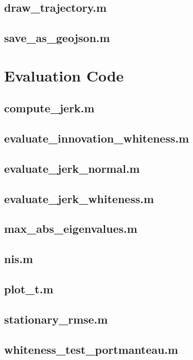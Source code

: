 \subsection{draw\_trajectory.m}

\subsection{save\_as\_geojson.m}


\section{Evaluation Code}
\subsection{compute\_jerk.m}

\subsection{evaluate\_innovation\_whiteness.m}

\subsection{evaluate\_jerk\_normal.m}

\subsection{evaluate\_jerk\_whiteness.m}

\subsection{max\_abs\_eigenvalues.m}

\subsection{nis.m}

\subsection{plot\_t.m}

\subsection{stationary\_rmse.m}

\subsection{whiteness\_test\_portmanteau.m}


